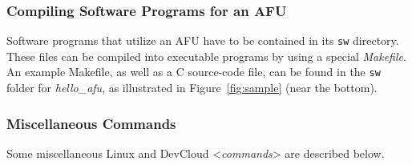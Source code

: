 \documentclass[11pt, twoside, pdftex]{article}
\begin{document}
\subsubsection{Compiling Software Programs for an AFU}
Software programs that utilize an AFU have to be contained in its \texttt{sw} directory.
These files can be compiled into executable programs by using a special {\it Makefile}. An
example Makefile, as well as a C source-code file, can be found in the \texttt{sw} folder 
for {\it hello\_afu}, as illustrated in Figure~\ref{fig:sample} (near the bottom).

\subsubsection{Miscellaneous Commands}
Some miscellaneous Linux and DevCloud <{\it commands}> are described below.
\end{document}
